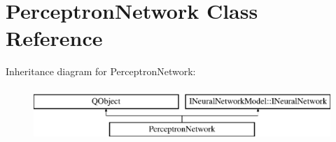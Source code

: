 \hypertarget{class_perceptron_network}{}\section{Perceptron\+Network Class Reference}
\label{class_perceptron_network}
Inheritance diagram for Perceptron\+Network\+:\begin{figure}[H]
\begin{center}
\leavevmode
\includegraphics[height=2.000000cm]{class_perceptron_network}
\end{center}
\end{figure}
